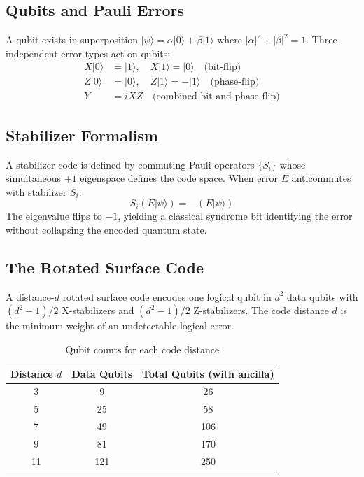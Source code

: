 \documentclass[12pt,a4paper]{article}
\begin{document}
\subsection{Qubits and Pauli Errors}
A qubit exists in superposition $|\psi\rangle = \alpha|0\rangle + \beta|1\rangle$
where $|\alpha|^2 + |\beta|^2 = 1$. Three independent error types act on qubits:
\begin{align}
X|0\rangle &= |1\rangle, \quad X|1\rangle = |0\rangle \quad \text{(bit-flip)}\\
Z|0\rangle &= |0\rangle, \quad Z|1\rangle = -|1\rangle \quad \text{(phase-flip)}\\
Y &= iXZ \quad \text{(combined bit and phase flip)}
\end{align}

\subsection{Stabilizer Formalism}
A stabilizer code is defined by commuting Pauli operators $\{S_i\}$ whose
simultaneous $+1$ eigenspace defines the code space. When error $E$ anticommutes
with stabilizer $S_i$:
\begin{equation}
S_i(E|\psi\rangle) = -(E|\psi\rangle)
\end{equation}
The eigenvalue flips to $-1$, yielding a classical syndrome bit identifying the
error without collapsing the encoded quantum state.

\subsection{The Rotated Surface Code}
A distance-$d$ rotated surface code encodes one logical qubit in $d^2$ data qubits
with $(d^2-1)/2$ X-stabilizers and $(d^2-1)/2$ Z-stabilizers. The code distance
$d$ is the minimum weight of an undetectable logical error.

\begin{table}[h]
\centering
\caption{Qubit counts for each code distance}
\begin{tabular}{ccc}
\toprule
Distance $d$ & Data Qubits & Total Qubits (with ancilla) \\
\midrule
3 & 9 & 26 \\
5 & 25 & 58 \\
7 & 49 & 106 \\
9 & 81 & 170 \\
11 & 121 & 250 \\
\bottomrule
\end{tabular}
\end{table}
\end{document}
